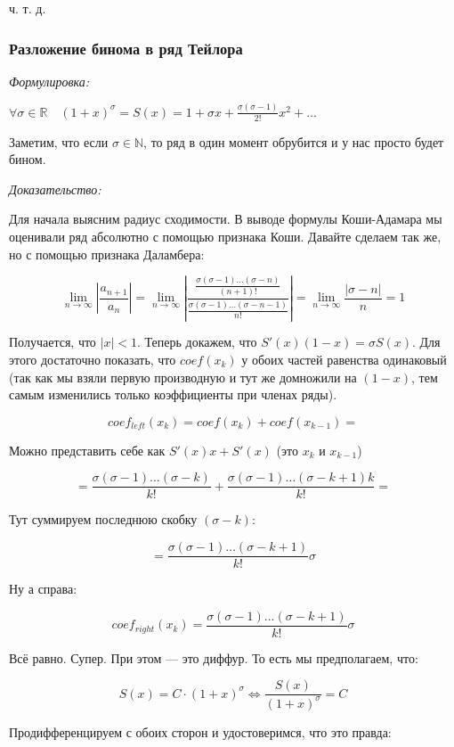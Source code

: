 \documentclass{article}
\begin{document}
ч. т. д.


\subsubsection{Разложение бинома в ряд Тейлора}
\textit{Формулировка:}

$\forall \sigma \in \mathbb{R} \quad (1 + x)^{\sigma} = S(x) = 1 + \sigma x + \frac{\sigma (\sigma - 1)}{2!}x^2 + \ldots$

Заметим, что если $\sigma \in \mathbb{N}$, то ряд в один момент обрубится и у нас просто будет бином.

\textit{Доказательство:}

Для начала выясним радиус сходимости. В выводе формулы Коши-Адамара мы оценивали ряд абсолютно с помощью признака Коши. Давайте сделаем так же, но с помощью признака Даламбера:

\[\lim_{n \rightarrow \infty}\left|\frac{a_{n + 1}}{a_{n}}\right| = \lim_{n \rightarrow \infty} \left| \frac{\frac{\sigma(\sigma - 1)\ldots(\sigma - n)}{(n + 1)!}}{\frac{\sigma(\sigma - 1)\ldots(\sigma - n - 1)}{n!}} \right| = \lim_{n \rightarrow \infty}{\frac{|\sigma - n|}{n}} = 1\]

Получается, что $|x| < 1$. Теперь докажем, что $S'(x)(1 - x) = \sigma S(x)$. Для этого достаточно показать, что $coef(x_k)$ у обоих частей равенства одинаковый (так как мы взяли первую производную и тут же домножили на $(1 - x)$, тем самым изменились только коэффициенты при членах ряды).

\[coef_{left}(x_k) = coef(x_k) + coef(x_{k - 1}) =\]

Можно представить себе как $S'(x)x + S'(x)$ (это $x_k$ и $x_{k - 1}$)
 
\[= \frac{\sigma(\sigma - 1) \ldots (\sigma - k)}{k!} + \frac{\sigma(\sigma - 1) \ldots (\sigma - k + 1)k}{k!} =\]

Тут суммируем последнюю скобку $(\sigma - k)$:

\[ = \frac{\sigma(\sigma - 1) \ldots (\sigma - k + 1)}{k!}\sigma \]

Ну а справа:

\[coef_{right}(x_k) = \frac{\sigma(\sigma - 1) \ldots (\sigma - k + 1)}{k!}\sigma\]

Всё равно. Супер. При этом --- это диффур. То есть мы предполагаем, что:

\[S(x) = C \cdot (1 + x)^{\sigma} \Leftrightarrow \frac{S(x)}{(1 + x)^{\sigma}} = C\]

Продифференцируем с обоих сторон и удостоверимся, что это правда:
\end{document}
